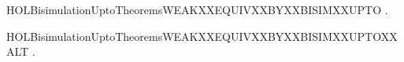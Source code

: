 \begin{SaveVerbatim}{HOLBisimulationUptoTheoremsWEAKXXEQUIVXXBYXXBISIMXXUPTO}
\HOLTokenTurnstile{} \HOLSymConst{\HOLTokenForall{}}  .   \HOLSymConst{\HOLTokenConj{}}    \HOLSymConst{\HOLTokenImp{}}   
\end{SaveVerbatim}
\newcommand{\HOLBisimulationUptoTheoremsWEAKXXEQUIVXXBYXXBISIMXXUPTO}{\UseVerbatim{HOLBisimulationUptoTheoremsWEAKXXEQUIVXXBYXXBISIMXXUPTO}}
\begin{SaveVerbatim}{HOLBisimulationUptoTheoremsWEAKXXEQUIVXXBYXXBISIMXXUPTOXXALT}
\HOLTokenTurnstile{} \HOLSymConst{\HOLTokenForall{}}  .   \HOLSymConst{\HOLTokenConj{}}    \HOLSymConst{\HOLTokenImp{}}   
\end{SaveVerbatim}
\newcommand{\HOLBisimulationUptoTheoremsWEAKXXEQUIVXXBYXXBISIMXXUPTOXXALT}{\UseVerbatim{HOLBisimulationUptoTheoremsWEAKXXEQUIVXXBYXXBISIMXXUPTOXXALT}}
